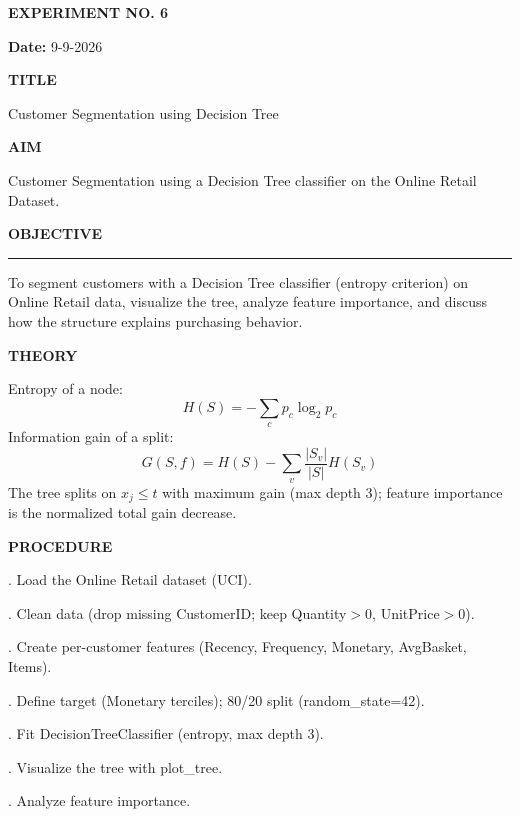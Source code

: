 \documentclass[11pt,twoside]{article}
\newcommand{\expheading}[1]{{\fontsize{14}{17}\selectfont\textbf{#1}\par}}
\newcommand{\fullrule}{\noindent\rule{\textwidth}{0.6pt}\par}
\begin{document}
{\setlength{\parskip}{1pt}\setlength{\abovedisplayskip}{2pt}\setlength{\belowdisplayskip}{2pt}
\begin{center}
\expheading{EXPERIMENT NO. 6}
\end{center}
\vspace{2pt}

\noindent\textbf{Date:} 9-9-2026\par
\vspace{6pt}

\expheading{TITLE}
\vspace{4pt}
\noindent Customer Segmentation using Decision Tree\par
\vspace{4pt}

\expheading{AIM}
\vspace{4pt}
\noindent Customer Segmentation using a Decision Tree classifier on the Online Retail Dataset. \par
\vspace{4pt}

\expheading{OBJECTIVE}
\vspace{2pt}
\fullrule
\vspace{4pt}
\noindent To segment customers with a Decision Tree classifier (entropy criterion) on Online Retail data, visualize the tree, analyze feature importance, and discuss how the structure explains purchasing behavior. \par
\vspace{4pt}

\expheading{THEORY}
\vspace{4pt}
Entropy of a node:
\[H(S)=-\sum_c p_c\log_2 p_c\]
Information gain of a split:
\[G(S,f)=H(S)-\sum_v\frac{|S_v|}{|S|}H(S_v)\]
The tree splits on $x_j \le t$ with maximum gain (max depth 3); feature importance is the normalized total gain decrease.
\vspace{4pt}

\expheading{PROCEDURE}
\vspace{4pt}
. Load the Online Retail dataset (UCI).\par
{}. Clean data (drop missing CustomerID; keep Quantity$>0$, UnitPrice$>0$).\par
{}. Create per-customer features (Recency, Frequency, Monetary, AvgBasket, Items).\par
{}. Define target (Monetary terciles); 80/20 split (random\_state=42).\par
{}. Fit DecisionTreeClassifier (entropy, max depth 3).\par
{}. Visualize the tree with plot\_tree.\par
{}. Analyze feature importance. \par
\vspace{4pt}

}
\end{document}
